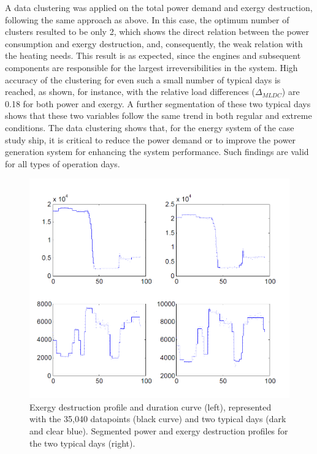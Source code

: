 \documentclass[preprint,12pt]{elsarticle}
\begin{document}
A data clustering was applied on the total power demand and exergy destruction, following the same approach as above. In this case, the optimum number of clusters resulted to be only 2, which shows the direct relation between the power consumption and exergy destruction, and, consequently, the weak relation with the heating needs. This result is as expected, since the engines and subsequent components are responsible for the largest irreversibilities in the system. High accuracy of the clustering for even such a small number of typical days is reached, as shown, for instance, with the relative load differences ($\Delta_{MLDC}$) are 0.18 for both power and exergy. A further segmentation of these two typical days shows that these two variables follow the same trend in both regular and extreme conditions. The data clustering shows that, for the energy system of the case study ship, it is critical to reduce the power demand or to improve the power generation system for enhancing the system performance. Such findings are valid for all types of operation days.  



\begin{figure}[htbp!]
	\centering
	\includegraphics[width=0.95\linewidth]{Figures/segmentation_power_exergy.png}
	\caption{Exergy destruction profile and duration curve (left), represented with the 35,040 datapoints (black curve) and two typical days (dark and clear blue). Segmented power and exergy destruction profiles for the two typical days (right). }
	\label{fig:res:exergyDestructionProfile}
\end{figure}
\end{document}
